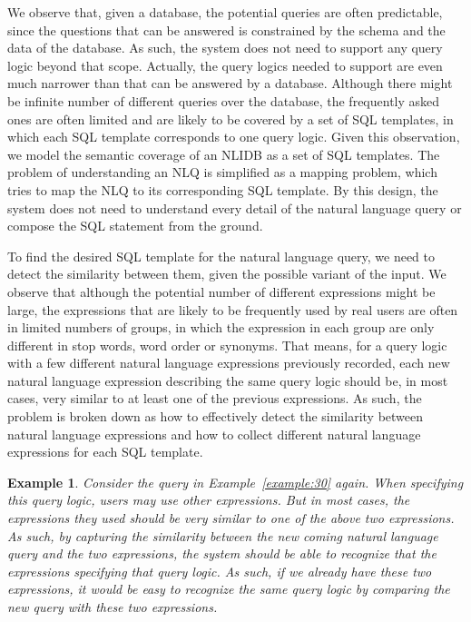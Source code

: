 \documentclass{vldb}
\newtheorem{example}{Example}
\begin{document}
We observe that, given a database, the potential queries are often predictable, since the questions that can be answered is constrained by the schema and the data of the database. As such, the system does not need to support any query logic beyond that scope. Actually, the query logics needed to support are even much narrower than that can be answered by a database. Although there might be infinite number of different queries over the database, the frequently asked ones are often limited and are likely to be covered by a set of SQL templates, in which each SQL template corresponds to one query logic. Given this observation, we model the semantic coverage of an NLIDB as a set of SQL templates. The problem of understanding an NLQ is simplified as a mapping problem, which tries to map the NLQ to its corresponding SQL template. By this design, the system does not need to understand every detail of the natural language query or compose the SQL statement from the ground.  

To find the desired SQL template for the natural language query, we need to detect the similarity between them, given the possible variant of the input.  We observe that although the potential number of different expressions might be large, the expressions that are likely to be frequently used by real users are often in limited numbers of groups, in which the expression in each group are only different in stop words, word order or synonyms.  That means, for a query logic with a few different natural language expressions previously recorded, each new natural language expression describing the same query logic should be, in most cases, very similar to at least one of the previous expressions.  As such, the problem is broken down as how to effectively detect the similarity between natural language expressions and how to collect different natural language expressions for each SQL template. 

\begin{example}
Consider the query in Example~\ref{example:30} again.  When specifying this query logic, users may use other expressions.  But in most cases, the expressions they used should be very similar to one of the above two expressions.  As such, by capturing the similarity between the new coming natural language query and the two expressions, the system should be able to recognize that the expressions specifying that query logic.  As such, if we already have these two expressions, it would be easy to recognize the same query logic by comparing the new query with these two expressions.  
\end{example}
\end{document}
